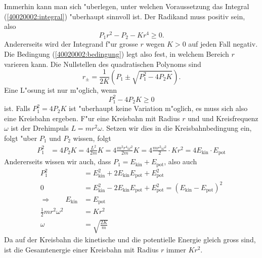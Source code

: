 Immerhin kann man sich "uberlegen, unter welchen Voraussetzung das
Integral
(\ref{40020002:integral})
"uberhaupt sinnvoll ist. Der Radikand muss positiv sein, also
\begin{equation}
P_1r^2-P_2-Kr^4\ge 0.
\label{40020002:bedingung}
\end{equation}
Andererseits wird der Integrand f"ur grosse $r$ wegen $K>0$ auf
jeden Fall negativ.  Die Bedingung (\ref{40020002:bedingung})
legt also fest, in welchem Bereich $r$ varieren kann. Die Nullstellen
des quadratischen Polynoms sind
\[
r_\pm=\frac{1}{2K}\left(P_1\pm\sqrt{P_1^2-4P_2K}\right).
\]
Eine L"osung ist nur m"oglich, wenn
\[
P_1^2-4P_2K\ge 0
\]
ist.
Falls $P_1^2=4P_2K$ ist "uberhaupt keine Variation m"oglich, es muss
sich also eine Kreisbahn ergeben. F"ur eine Kreisbahn mit Radius $r$ 
und und Kreisfrequenz $\omega$ ist der Drehimpuls $L=mr^2\omega$.
Setzen wir dies in die Kreisbahnbedingung ein, folgt
"uber $P_1$ und $P_2$ wissen, folgt
\begin{align*}
P_1^2&=4P_2K
=
4\frac{L^2}{2m}K
=
4\frac{m^2r^4\omega^2}{2m}K
=
4 \frac{mr^2\omega^2}{2}  \cdot Kr^2
=
4 E_{\text{kin}}\cdot E_{\text{pot}}
\end{align*}
Andererseits wissen wir auch, dass $P_1=E_{\text{kin}}+E_{\text{pot}}$,
also auch
\begin{align*}
P_1^2&=
E_{\text{kin}}^2
+ 2 
E_{\text{kin}}
E_{\text{pot}}
+
E_{\text{pot}}^2
\\
0&=
E_{\text{kin}}^2
- 2 
E_{\text{kin}}
E_{\text{pot}}
+
E_{\text{pot}}^2
=
(E_{\text{kin}}
-
E_{\text{pot}})^2
\\
\Rightarrow\qquad
E_{\text{kin}}
&=
E_{\text{pot}}
\\
\frac12mr^2\omega^2&=Kr^2
\\
\omega&=\sqrt{\frac{2K}{m}}
\end{align*}
Da auf der Kreisbahn die kinetische und die potentielle Energie
gleich gross sind, ist die Gesamtenergie einer Kreisbahn mit Radius
$r$ immer $Kr^2$.

